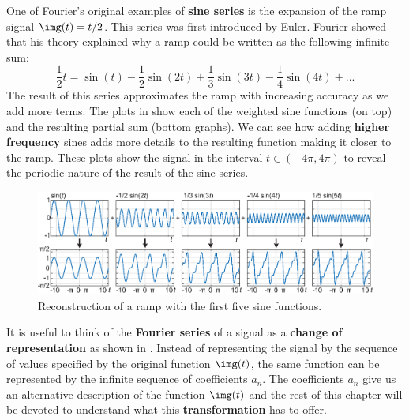 One of Fourier's original examples of {\bf sine series}
is the expansion of the ramp signal $\img (t)=t/2$. This series was first introduced by Euler. Fourier showed that his theory explained why a ramp could be written as the following infinite sum:
\begin{equation}
	\frac{1}{2} t =  \sin (t) - \frac{1}{2}  \sin (2t) + \frac{1}{3} \sin (3t) - \frac{1}{4}  \sin (4t) + ...
\end{equation}
The result of this series approximates the ramp with increasing accuracy as we add more terms. The plots in \fig{\ref{fig:FourierSeries6}} show each of the weighted sine functions (on top) and the resulting partial sum (bottom graphs). We can see how adding {\bf higher frequency} sines adds more details to the resulting function making it closer to the ramp. These plots show the signal in the interval $t \in (-4 \pi, 4 \pi)$ to reveal the periodic nature of the result of the sine series.

\begin{figure}[t]
	\centerline{
		\includegraphics[width=1\linewidth]{figures/Image_processing_fourier/FourierSeries6.eps}
	}
	\caption{Reconstruction of a ramp with the first five sine functions.}
	\label{fig:FourierSeries6}
\end{figure}


It is useful to think of the {\bf Fourier series} of a signal as a {\bf change of representation} as shown in \fig{\ref{fig:FourierSeries5_representation}}. Instead of representing the signal by the sequence of values specified by the original function $\img (t)$, the same function can be represented by the infinite sequence of coefficients $a_n$. The coefficients $a_n$ give us an alternative description of the function $\img(t)$ and the rest of this chapter will be devoted to understand what this {\bf transformation} has to offer.

